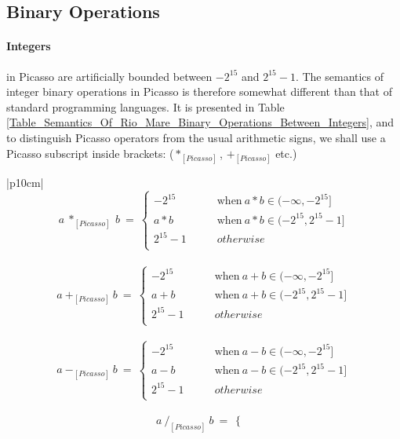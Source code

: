\documentclass{article}
\begin{document}
\subsection{Binary Operations}
\paragraph{Integers} in Picasso are artificially bounded between $-2^{15}$ and $2^{15}-1$.
The semantics of integer binary operations in Picasso is therefore somewhat different
than that of standard programming languages.
It is presented in Table \ref{Table_Semantics_Of_Rio_Mare_Binary_Operations_Between_Integers},
and to distinguish Picasso operators from the usual arithmetic signs,
we shall use a Picasso subscript inside brackets:
($*_{[Picasso]}$, $+_{[Picasso]}$ etc.)
\begin{table}[h]
\centering
\begin{tabular}{|p{10cm}|}
\hline
\[
a ~ *_{[Picasso]} ~ b ~ = ~
\begin{cases} 
-2^{15}  ~ & ~ ~ ~ ~ ~ ~ ~ ~ \text{when} ~ a*b \in (-\infty, -2^{15}] \\
a*b      ~ & ~ ~ ~ ~ ~ ~ ~ ~ \text{when} ~ a*b \in (-2^{15},2^{15}-1] \\
2^{15}-1 ~ & ~ ~ ~ ~ ~ ~ ~ ~ otherwise                                \\
\end{cases}
\]
\\ \hline
\[
a ~ +_{[Picasso]} ~ b ~ = ~
\begin{cases} 
-2^{15}  ~ & ~ ~ ~ ~ ~ ~ ~ ~ \text{when} ~ a+b \in (-\infty, -2^{15}] \\
a+b      ~ & ~ ~ ~ ~ ~ ~ ~ ~ \text{when} ~ a+b \in (-2^{15},2^{15}-1] \\
2^{15}-1 ~ & ~ ~ ~ ~ ~ ~ ~ ~ otherwise                                \\
\end{cases}
\]
\\ \hline
\[
a ~ -_{[Picasso]} ~ b ~ = ~
\begin{cases} 
-2^{15}  ~ & ~ ~ ~ ~ ~ ~ ~ ~ \text{when} ~ a-b \in (-\infty, -2^{15}] \\
a-b      ~ & ~ ~ ~ ~ ~ ~ ~ ~ \text{when} ~ a-b \in (-2^{15},2^{15}-1] \\
2^{15}-1 ~ & ~ ~ ~ ~ ~ ~ ~ ~ otherwise                                \\
\end{cases}
\]
\\ \hline
\[
a ~ /_{[Picasso]} ~ b ~ = ~
\begin{cases} 

\end{cases}\]
\end{tabular}
\end{table}
\end{document}
